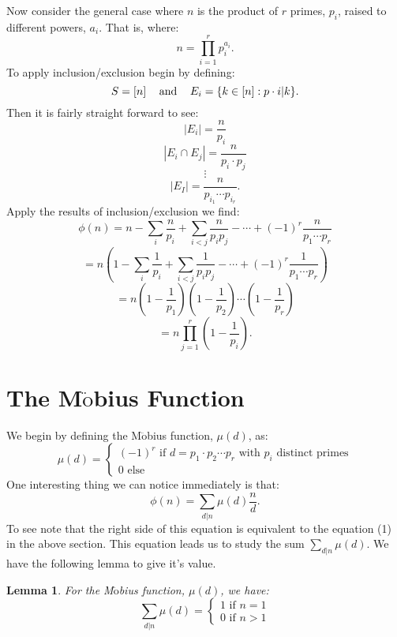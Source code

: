 \documentclass[11pt]{article}
\newtheorem{lemma}[theorem]{Lemma}
\begin{document}
Now consider the general case where $n$ is the product of $r$ primes, $p_i$, raised to different powers, $a_i$. That is, where:
	\[n=\prod_{i=1}^{r} p_i^{a_i} .\] 
To apply inclusion/exclusion begin by defining:
	\[S=[n] \hspace{3mm} \mbox{ and } \hspace{3mm} E_i = \{k \in [n] : p \cdot i | k \} .\] 
Then it is fairly straight forward to see:
	\[|E_i|=\frac{n}{p_i}\] 
	\[|E_i \cap E_j|=\frac{n}{p_{i}\cdot p_{j}}\] 
	\[\vdots\] 
	\[|E_I|=\frac{n}{p_{i_1}\cdots p_{i_r}}.\] 
Apply the results of inclusion/exclusion we find:
	\[\phi(n)=n - \sum_i\frac{n}{p_i} + \sum_{i<j} \frac{n}{p_i p_j} - \cdots + (-1)^r\frac{n}{p_1\cdots p_r} \] 
	\begin{equation}\label{1} =n(1-\sum_i\frac{1}{p_i} + \sum_{i<j} \frac{1}{p_i p_j} - \cdots + (-1)^r\frac{1}{p_1\cdots p_r}) \end{equation} 	\[=n(1-\frac{1}{p_1})(1-\frac{1}{p_2})\cdots(1-\frac{1}{p_r})\] 
	\[=n \prod_{j=1}^{r} (1 - \frac{1}{p_i}).\] 

\section{The M$\ddot{\mbox{o}}$bius Function}
We begin by defining the M$\ddot{\mbox{o}}$bius function, $\mu(d)$, as:
 \begin{displaymath}
   {\mu(d)} = \left\{
     \begin{array}{l}
       (-1)^r \mbox{ if } d=p_1\cdot p_2\cdots p_r \mbox{ with } p_i \mbox{ distinct primes}\\
       0 \mbox{ else}
     \end{array}
   \right.
\end{displaymath}    
One interesting thing we can notice immediately is that:
	\[\phi(n)=\sum_{d|n} \mu(d)\frac{n}{d}.\]
To see note that the right side of this equation is equivalent to the equation (1) in the above section.
This equation leads us to study the sum $\sum_{d|n} \mu(d)$. We have the following lemma to give it's value.

\begin{lemma}
For the M$\ddot{\mbox{o}}$bius function, $\mu(d)$, we have:
 \begin{displaymath}
   {\sum_{d|n}\mu(d)} = \left\{
     \begin{array}{l}
       1 \mbox{ if } n=1\\
       0 \mbox{ if } n>1
     \end{array}
   \right.
\end{displaymath}
\end{lemma}
\end{document}
